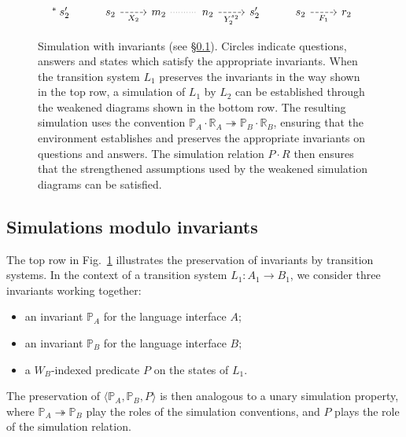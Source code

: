 \documentclass[acmsmall,screen,review,anonymous]{acmart}
\begin{document}
\begin{figure}
\[\begin{tikzcd}
      |[alias=R22]| \!\!\! {}^* \: s_2' &
      |[alias=X12]| s_2 \ar[r, "X_2"', dashed] &
      |[alias=X22]| m_2 \ar[r, dotted, dash] &
      |[alias=Y12]| n_2 \ar[r, "Y_2^{s_2}"', dashed] &
      |[alias=Y22]| s_2' &
      |[alias=F12]| s_2 \ar[r, "F_1"', dashed] &
      |[alias=F22]| r_2
    \end{tikzcd}
  \]
  \caption{Simulation with invariants (see \S\ref{sec:fsim-inv}).
    Circles indicate questions, answers and states
    which satisfy the appropriate invariants.
    When the transition system $L_1$ preserves the invariants
    in the way shown in the top row,
    a simulation of $L_1$ by $L_2$ can be established through
    the weakened diagrams shown in the bottom row.
    The resulting simulation uses the convention
    $\mathbb{P}_A \cdot \mathbb{R}_A \twoheadrightarrow
     \mathbb{P}_B \cdot \mathbb{R}_B$,
    ensuring that the environment
    establishes and preserves the appropriate invariants
    on questions and answers.
    The simulation relation $P \cdot R$ then ensures that
    the strengthened assumptions used by the
    weakened simulation diagrams can be satisfied.}
  \label{fig:fsim-inv}
\end{figure}

\subsection{Simulations modulo invariants} \label{sec:fsim-inv} %

The top row in Fig.~\ref{fig:fsim-inv}
illustrates the preservation of invariants by transition systems.
In the context of a transition system
$L_1 : A_1 \rightarrow B_1$,
we consider three invariants working together:
\begin{itemize}
  \item an invariant $\mathbb{P}_A$ for the language interface $A$;
  \item an invariant $\mathbb{P}_B$ for the language interface $B$;
  \item a $W_B$-indexed predicate $P$ on the states of $L_1$.
\end{itemize}
The preservation of
$\langle \mathbb{P}_A, \mathbb{P}_B, P \rangle$
is then analogous to a unary simulation property,
where $\mathbb{P}_A \twoheadrightarrow \mathbb{P}_B$
play the roles of the simulation conventions,
and $P$ plays the role of the simulation relation.
\end{document}
